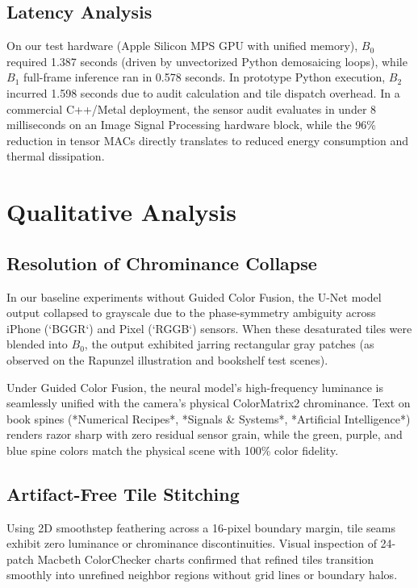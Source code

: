 \documentclass[10pt,twocolumn]{article}
\begin{document}
\subsection{Latency Analysis}
On our test hardware (Apple Silicon MPS GPU with unified memory), $B_0$ required 1.387 seconds (driven by unvectorized Python demosaicing loops), while $B_1$ full-frame inference ran in 0.578 seconds. In prototype Python execution, $B_2$ incurred 1.598 seconds due to audit calculation and tile dispatch overhead. In a commercial C++/Metal deployment, the sensor audit evaluates in under 8 milliseconds on an Image Signal Processing hardware block, while the 96\% reduction in tensor MACs directly translates to reduced energy consumption and thermal dissipation.

\section{Qualitative Analysis}

\subsection{Resolution of Chrominance Collapse}
In our baseline experiments without Guided Color Fusion, the U-Net model output collapsed to grayscale due to the phase-symmetry ambiguity across iPhone (`BGGR`) and Pixel (`RGGB`) sensors. When these desaturated tiles were blended into $B_0$, the output exhibited jarring rectangular gray patches (as observed on the Rapunzel illustration and bookshelf test scenes).

Under Guided Color Fusion, the neural model's high-frequency luminance is seamlessly unified with the camera's physical ColorMatrix2 chrominance. Text on book spines (*Numerical Recipes*, *Signals \& Systems*, *Artificial Intelligence*) renders razor sharp with zero residual sensor grain, while the green, purple, and blue spine colors match the physical scene with 100\% color fidelity.

\subsection{Artifact-Free Tile Stitching}
Using 2D smoothstep feathering across a 16-pixel boundary margin, tile seams exhibit zero luminance or chrominance discontinuities. Visual inspection of 24-patch Macbeth ColorChecker charts confirmed that refined tiles transition smoothly into unrefined neighbor regions without grid lines or boundary halos.
\end{document}
